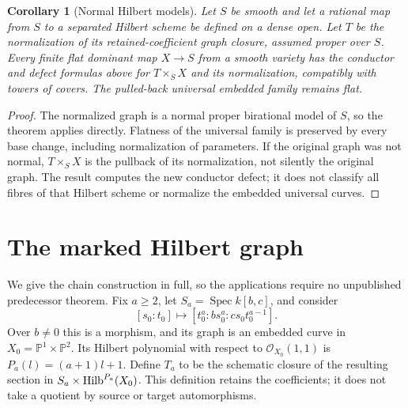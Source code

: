 \documentclass[11pt,reqno]{amsart}
\numberwithin{equation}{section}
\newtheorem{corollary}[theorem]{Corollary}
\theoremstyle{definition}\newtheorem{definition}[theorem]{Definition}
\theoremstyle{remark}\newtheorem{remark}[theorem]{Remark}
\newcommand{\Pj}{\mathbb P}\newcommand{\A}{\mathbb A}
\newcommand{\OO}{\mathcal O}\newcommand{\II}{\mathcal I}
\DeclareMathOperator{\Spec}{Spec}\DeclareMathOperator{\PGL}{PGL}
\begin{document}
\begin{corollary}[Normal Hilbert models]\label{cor:general-hilbert-v171}
Let $S$ be smooth and let a rational map from $S$ to a separated
Hilbert scheme be defined on a dense open. Let $T$ be the normalization
of its retained-coefficient graph closure, assumed proper over $S$.
Every finite flat dominant map $X\to S$ from a smooth variety has the
conductor and defect formulas above for $T\times_S X$ and its
normalization, compatibly with towers of covers. The pulled-back
universal embedded family remains flat.
\end{corollary}
\begin{proof}
The normalized graph is a normal proper birational model of $S$,
so the theorem applies directly. Flatness of the universal family is
preserved by every base change, including normalization of parameters.
If the original graph was not normal, $T\times_S X$ is the pullback
of its normalization, not silently the original graph. The result
computes the new conductor defect; it does not classify all fibres of
that Hilbert scheme or normalize the embedded universal curves.
\end{proof}


\section{The marked Hilbert graph}
\label{sec:chain-v171}
We give the chain construction in full, so the applications require no
unpublished predecessor theorem. Fix $a\geq2$, let
$S_a=\Spec k[b,c]$, and consider
\begin{equation}\label{eq:marked-map-v171}
 [s_0:t_0]\longmapsto[t_0^a:b s_0^a:cs_0t_0^{a-1}].
\end{equation}
Over $b\ne0$ this is a morphism, and its graph is an embedded curve in
$X_0=\Pj^1\times\Pj^2$. Its Hilbert polynomial with respect to
$\OO_{X_0}(1,1)$ is $P_a(l)=(a+1)l+1$. Define $T_a$ to be the
schematic closure of the resulting section in
$S_a\times\operatorname{Hilb}^{P_a}(X_0)$. This definition retains the coefficients;
it does not take a quotient by source or target automorphisms.
\end{document}

